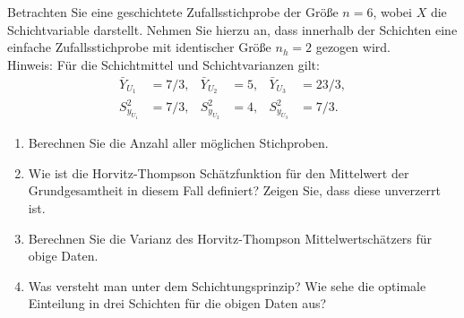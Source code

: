 \documentclass{article}
\begin{document}
Betrachten Sie eine geschichtete Zufallsstichprobe der Größe $n=6$, wobei $X$ die Schichtvariable darstellt. Nehmen Sie hierzu an, dass innerhalb der Schichten eine einfache Zufallsstichprobe mit identischer Größe $n_h=2$ gezogen wird.\\Hinweis: Für die Schichtmittel und Schichtvarianzen gilt: 
\begin{align*}
\bar{Y}_{U_1} &=7/3,& \bar{Y}_{U_2}&=5,& \bar{Y}_{U_3}&=23/3,\\ S_{y_{U_1}}^2&=7/3,& S_{y_{U_2}}^2&=4,& S_{y_{U_3}}^2&=7/3.
\end{align*}
\begin{enumerate}
	\item Berechnen Sie die Anzahl aller möglichen Stichproben.
	\item  Wie ist die Horvitz-Thompson Schätzfunktion für den Mittelwert der Grundgesamtheit in diesem Fall definiert? Zeigen Sie, dass diese unverzerrt ist.
	\item Berechnen Sie die Varianz des Horvitz-Thompson Mittelwertschätzers für obige Daten.
	\item Was versteht man unter dem Schichtungsprinzip? Wie sehe die optimale Einteilung in drei Schichten für die obigen Daten aus?
\end{enumerate}
\end{document}
